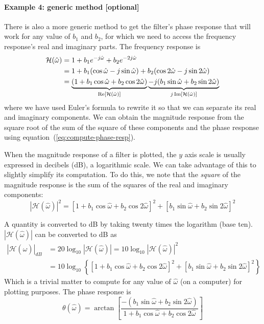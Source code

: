\paragraph*{Example 4: generic method [optional]}
There is also a more generic method to get the filter's phase response that will work for any value of $b_1$ and $b_2$, for which we need to access the frequency
response's real and imaginary parts. The frequency response
is
\begin{align}
\mathcal{H}(\hat{\omega}) &= 1 + b_1e^{-j\hat{\omega}} + b_2e^{-2j\hat{\omega}}
\label{eq:ff-2ztho} \\
     &= 1 + b_1(\cos\hat{\omega} - j\sin\hat{\omega})
        + b_2(\cos 2\hat{\omega} - j\sin 2\hat{\omega})
\notag \\
     &= \underbrace{(1 +b_1\cos\hat{\omega}+b_2\cos
       2\hat{\omega})}_{\operatorname{Re}[\mathcal{H}(\hat{\omega})]}
        \underbrace{-j(b_1\sin\hat{\omega}+b_2\sin
          2\hat{\omega})}_{j\operatorname{Im}[\mathcal{H}(\hat{\omega})]}
\notag
\end{align}
where we have used Euler's formula to rewrite it so that we can
separate its real and imaginary components. We can obtain the
magnitude response from the square root of the sum of the square of
these components and the phase response using
equation~(\ref{eq:compute-phase-resp}).

When the magnitude response of a filter is plotted, the $y$ axis scale
is usually expressed in decibels (dB), a logarithmic scale. We can
take advantage of this to slightly simplify its
computation.  To do this, we note that the \emph{square} of the
magnitude response is the sum of the squares of the real and imaginary
components:
\begin{equation}
|\mathcal{H}(\hat{\omega})|^2=[1 +b_1\cos\hat{\omega}+b_2\cos 2\hat{\omega}]^2 +
              [b_1\sin\hat{\omega}+b_2\sin 2\hat{\omega}]^2
\label{eq:ff-exph1}
\end{equation}

A quantity is converted to dB by taking twenty times the logarithm
(base ten).  $|\mathcal{H}(\hat{\omega})|$ can be converted to dB as
\begin{align*}
|\mathcal{H}(\hat{\omega})|_{\mathit{dB}} &= 20\log_{10}|\mathcal{H}(\hat{\omega})|=10\log_{10}|\mathcal{H}(\hat{\omega})|^2
\\
           &= 10\log_{10}\left\{[1 +b_1\cos\hat{\omega}+b_2\cos 2\hat{\omega}]^2 +
               [b_1\sin\hat{\omega}+b_2\sin 2\hat{\omega}]^2\right\}
\end{align*}
Which is a trivial matter to compute for any value of $\hat{\omega}$ (on a
computer) for plotting purposes.  The phase response is
\begin{equation}
\theta(\hat{\omega})=\arctan\left[\frac{-(b_1\sin\hat{\omega}+b_2\sin 2\hat{\omega})}
                            {1 +b_1\cos\hat{\omega}+b_2\cos 2\hat{\omega}}\right]
\label{eq:ff-expph1}
\end{equation}

